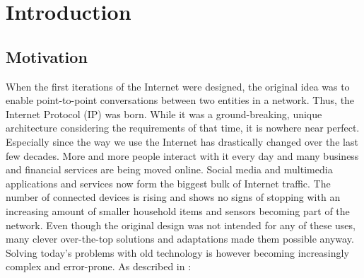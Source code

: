 \chapter{Introduction} \label{chapter:Introduction}

\section{Motivation}


When the first iterations of the Internet were designed, the original idea was to enable point-to-point conversations between two entities in a network. Thus, the Internet Protocol (IP) was born. While it was a ground-breaking, unique architecture considering the requirements of that time, it is nowhere near perfect. Especially since the way we use the Internet has drastically changed over the last few decades. More and more people interact with it every day and many business and financial services are being moved online. Social media and multimedia applications and services now form the biggest bulk of Internet traffic. The number of connected devices is rising and shows no signs of stopping with an increasing amount of smaller household items and sensors becoming part of the network. Even though the original design was not intended for any of these uses, many clever over-the-top solutions and adaptations made them possible anyway. Solving today's problems with old technology is however becoming increasingly complex and error-prone. As described in \cite{ZEBJ10}: \\


